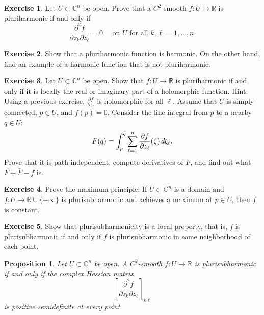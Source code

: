 \documentclass[12pt,openany]{book}
\newcommand{\avoidbreak}{\postdisplaypenalty=100}
\newcommand{\C}{{\mathbb{C}}}
\newcommand{\R}{{\mathbb{R}}}
\theoremstyle{plain}
\newtheorem{prop}[thm]{Proposition}
\theoremstyle{remark}
\theoremstyle{definition}
\newenvironment{exbox}{%
    \def\FrameCommand{\vrule width 1pt \relax\hspace{10pt}}%
    \MakeFramed{\advance\hsize-\width\FrameRestore}%
}{%
    \endMakeFramed
}
\theoremstyle{exercise}
\newtheorem{exercise}{Exercise}[section]
\theoremstyle{example}
\begin{document}
\begin{exbox}
\begin{exercise}
Let $U \subset \C^n$ be open.
Prove that
a $C^2$-smooth $f \colon U \to \R$ is pluriharmonic if and
only if
\begin{equation*}
\frac{\partial^2 f}{\partial \bar{z}_k \partial z_\ell} = 0
\quad \text{ on $U$ for all $k,\ell=1,\ldots,n$.}
\end{equation*}
\end{exercise}

\begin{exercise}
Show that a pluriharmonic function is harmonic.  On the other hand, find an
example of a harmonic function that is not pluriharmonic.
\end{exercise}

\begin{exercise}
Let $U \subset \C^n$ be open.
Show that $f \colon U \to \R$ is pluriharmonic if and
only if it is locally the real or imaginary part of a holomorphic function.
Hint:  Using a previous exercise,
$\frac{\partial f}{\partial z_\ell}$ is holomorphic for all $\ell$.
Assume that $U$ is simply connected, $p \in U$, and
$f(p) = 0$.
Consider the line integral from $p$ to a nearby $q \in U$:
\begin{equation*}
F(q) =
\int_{p}^q \sum_{\ell=1}^n
\frac{\partial f}{\partial z_\ell}(\zeta) \, d\zeta_\ell .
\avoidbreak
\end{equation*}
Prove that it is path independent, compute derivatives of $F$, and
find out what $F+\bar{F}-f$ is.
\end{exercise}

\begin{exercise}
Prove the maximum
principle:
If $U \subset \C^n$ is a domain and $f \colon U \to \R \cup
\{-\infty\}$ is
plurisubharmonic and achieves a maximum at $p \in U$, then $f$ is constant.
\end{exercise}

\begin{exercise}
Show that plurisubharmonicity is a local property, that is,
$f$ is plurisubharmonic if and only if $f$ is plurisubharmonic in
some neighborhood of each point.
\end{exercise}
\end{exbox}

\begin{samepage}
\begin{prop}
Let $U \subset \C^n$ be open.
A $C^2$-smooth $f \colon U \to \R$ is plurisubharmonic
if and only if the complex Hessian matrix
\begin{equation*}
\left[
\frac{\partial^2 f}{\partial \bar{z}_k \partial z_\ell}
\right]_{k\ell}
\end{equation*}
is positive semidefinite at every
point.
\end{prop}
\end{samepage}
\end{document}
